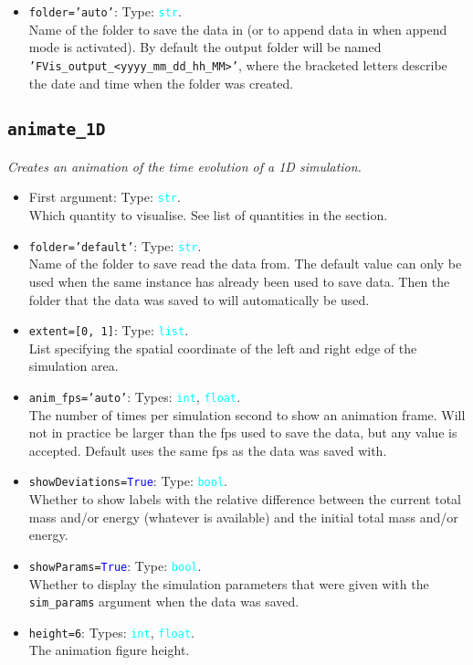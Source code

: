 \documentclass{article}
\newcommand{\ttt}[1]{\texttt{#1}}
\newcommand{\ptype}[1]{\texttt{\textcolor{cyan}{#1}}}
\newcommand{\cbl}[1]{\textcolor{blue}{#1}}
\newcommand{\cro}[1]{\textcolor{RedOrange}{#1}}
\newcommand{\cyo}[1]{\textcolor{YellowOrange}{#1}}
\begin{document}
\begin{itemize}
	\item \ttt{\cro{folder}=\cyo{'auto'}}: Type: \ptype{str}.\\Name of the folder to save the data in (or to append data in when append mode is activated). By default the output folder will be named \ttt{'FVis\_output\_<yyyy\_mm\_dd\_hh\_MM>'}, where the bracketed letters describe the date and time when the folder was created.
\end{itemize}

\subsection{\ttt{animate\_1D}}
\label{sec:anim1}
\textit{Creates an animation of the time evolution of a 1D simulation.}
\begin{itemize}
	\item First argument: Type: \ptype{str}.\\Which quantity to visualise. See list of quantities in the  section.
	\item \ttt{\cro{folder}=\cyo{'default'}}: Type: \ptype{str}.\\Name of the folder to save read the data from. The default value can only be used when the same instance has already been used to save data. Then the folder that the data was saved to will automatically be used.
	\item \ttt{\cro{extent}=[0, 1]}: Type: \ptype{list}.\\List specifying the spatial coordinate of the left and right edge of the simulation area.
	\item \ttt{\cro{anim\_fps}=\cyo{'auto'}}: Types: \ptype{int}, \ptype{float}.\\The number of times per simulation second to show an animation frame. Will not in practice be larger than the fps used to save the data, but any value is accepted. Default uses the same fps as the data was saved with.
	\item \ttt{\cro{showDeviations}=\cbl{True}}: Type: \ptype{bool}.\\Whether to show labels with the relative difference between the current total mass and/or energy (whatever is available) and the initial total mass and/or energy.
	\item \ttt{\cro{showParams}=\cbl{True}}: Type: \ptype{bool}.\\Whether to display the simulation parameters that were given with the \ttt{sim\_params} argument when the data was saved.
	\item \ttt{\cro{height}=6}: Types: \ptype{int}, \ptype{float}.\\The animation figure height.

\end{itemize}
\end{document}
